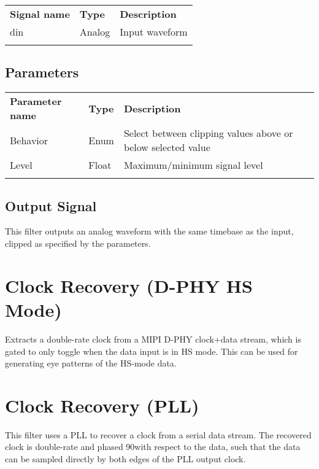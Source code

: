 \begin{tabularx}{16cm}{llX}
\thickhline
\textbf{Signal name} & \textbf{Type} & \textbf{Description} \\
\thickhline
din & Analog & Input waveform \\
\thickhline
\end{tabularx}

\subsection{Parameters}

\begin{tabularx}{16cm}{llX}
\thickhline
\textbf{Parameter name} & \textbf{Type} & \textbf{Description} \\
\thickhline
Behavior & Enum & Select between clipping values above or below selected value\\
\thinhline
Level & Float & Maximum/minimum signal level\\
\thickhline
\end{tabularx}

\subsection{Output Signal}

This filter outputs an analog waveform with the same timebase as the input, clipped as specified by the parameters.

\pagebreak
\section{Clock Recovery (D-PHY HS Mode)}

Extracts a double-rate clock from a MIPI D-PHY clock+data stream, which is gated to only toggle when the data input
is in HS mode. This can be used for generating eye patterns of the HS-mode data.

\pagebreak
\section{Clock Recovery (PLL)}
\label{filter:cdrpll}

This filter uses a PLL to recover a clock from a serial data stream. The recovered clock is double-rate and
phased 90\textdegree with respect to the data, such that the data can be sampled directly by both edges of the PLL
output clock.

